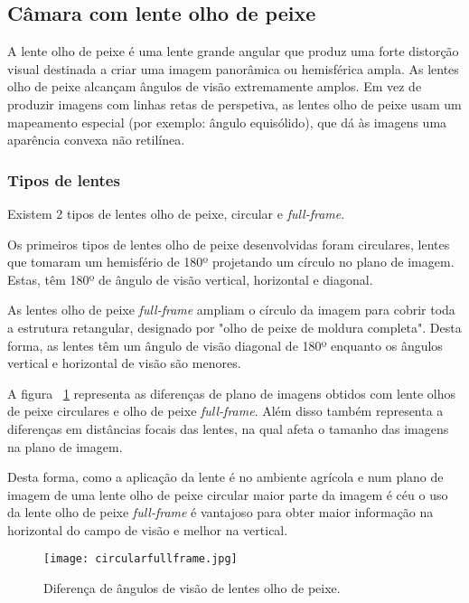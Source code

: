 \subsection{Câmara com lente olho de peixe}

A lente olho de peixe é uma lente grande angular que produz uma forte distorção visual destinada a criar uma imagem panorâmica ou hemisférica ampla. As lentes olho de peixe alcançam ângulos de visão extremamente amplos. Em vez de produzir imagens com linhas retas de perspetiva, as lentes olho de peixe usam um mapeamento especial (por exemplo: ângulo equisólido), que dá às imagens uma aparência convexa não retilínea.

\subsubsection{Tipos de lentes}

Existem 2 tipos de lentes olho de peixe, circular e \textit{full-frame}. 

Os primeiros tipos de lentes olho de peixe desenvolvidas foram circulares, lentes que tomaram um hemisfério de 180º projetando um círculo no plano de imagem. Estas, têm 180º de ângulo de visão vertical, horizontal e diagonal. 

As lentes olho de peixe \textit{full-frame} ampliam o círculo da imagem para cobrir toda a estrutura retangular, designado por "olho de peixe de moldura completa". Desta forma, as lentes têm um ângulo de visão diagonal de 180º enquanto os ângulos vertical e horizontal de visão são menores. 

A figura ~\ref{fig:circularfullframe} representa as diferenças de plano de imagens obtidos com lente olhos de peixe circulares e olho de peixe \textit{full-frame}. Além disso também representa a diferenças em distâncias focais das lentes, na qual afeta o tamanho das imagens na plano de imagem.


Desta forma, como a aplicação da lente é no ambiente agrícola e num plano de imagem de uma lente olho de peixe circular maior parte da imagem é céu o uso da lente olho de peixe \textit{full-frame} é vantajoso para obter maior informação na horizontal do campo de visão e melhor na vertical.  

\begin{figure}[h!] %
	\begin{center}
		\leavevmode		
		\texttt{[image: circularfullframe.jpg]}
		\caption{Diferença de ângulos de visão de lentes olho de peixe.}
		\label{fig:circularfullframe}
	\end{center}
\end{figure}


